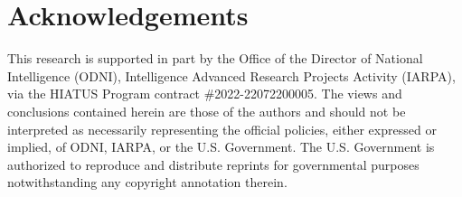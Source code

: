 \section*{Acknowledgements}

This research is supported in part by the Office of the Director of National Intelligence (ODNI), Intelligence Advanced Research Projects Activity (IARPA), via the HIATUS Program contract \#2022-22072200005. The views and conclusions contained herein are those of the authors and should not be interpreted as necessarily representing the official policies, either expressed or implied, of ODNI, IARPA, or the U.S. Government. The U.S. Government is authorized to reproduce and distribute reprints for governmental purposes notwithstanding any copyright annotation therein.